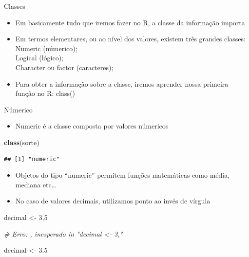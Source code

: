 \documentclass[
  10pt,
  ignorenonframetext,
]{beamer}
\newenvironment{Shaded}{\begin{snugshade}}{\end{snugshade}}
\newcommand{\CommentTok}[1]{\textcolor[rgb]{0.56,0.35,0.01}{\textit{#1}}}
\newcommand{\DecValTok}[1]{\textcolor[rgb]{0.00,0.00,0.81}{#1}}
\newcommand{\FloatTok}[1]{\textcolor[rgb]{0.00,0.00,0.81}{#1}}
\newcommand{\KeywordTok}[1]{\textcolor[rgb]{0.13,0.29,0.53}{\textbf{#1}}}
\newcommand{\NormalTok}[1]{#1}
\newcommand{\StringTok}[1]{\textcolor[rgb]{0.31,0.60,0.02}{#1}}
\providecommand{\tightlist}{%
  \setlength{\itemsep}{0pt}\setlength{\parskip}{0pt}}
\begin{document}
\begin{frame}{Classes}
\protect\hypertarget{classes}{}
\begin{itemize}
\tightlist
\item
  Em basicamente tudo que iremos fazer no R, a classe da informação
  importa
\item
  Em termos elementares, ou ao nível dos valores, existem três grandes
  classes:\\
  Numeric (númerico);\\
  Logical (lógico);\\
  Character ou factor (caracteres);
\item
  Para obter a informação sobre a classe, iremos aprender nossa primeira
  função no R: class()
\end{itemize}
\end{frame}

\begin{frame}[fragile]{Númerico}
\protect\hypertarget{nuxfamerico}{}
\begin{itemize}
\tightlist
\item
  Numeric é a classe composta por valores númericos
\end{itemize}

\begin{Shaded}
\begin{Highlighting}[]
\KeywordTok{class}\NormalTok{(sorte)}
\end{Highlighting}
\end{Shaded}

\begin{verbatim}
## [1] "numeric"
\end{verbatim}

\begin{itemize}
\tightlist
\item
  Objetos do tipo ``numeric'' permitem funções matemáticas como média,
  mediana etc\ldots{}
\item
  No caso de valores decimais, utilizamos ponto ao invés de vírgula
\end{itemize}

\begin{Shaded}
\begin{Highlighting}[]
\NormalTok{decimal \textless{}{-}}\StringTok{ }\DecValTok{3}\NormalTok{,}\DecValTok{5}

\CommentTok{\# Erro: \textquotesingle{},\textquotesingle{} inesperado in "decimal \textless{}{-} 3,"}

\NormalTok{decimal \textless{}{-}}\StringTok{ }\FloatTok{3.5}
\end{Highlighting}
\end{Shaded}
\end{frame}
\end{document}
